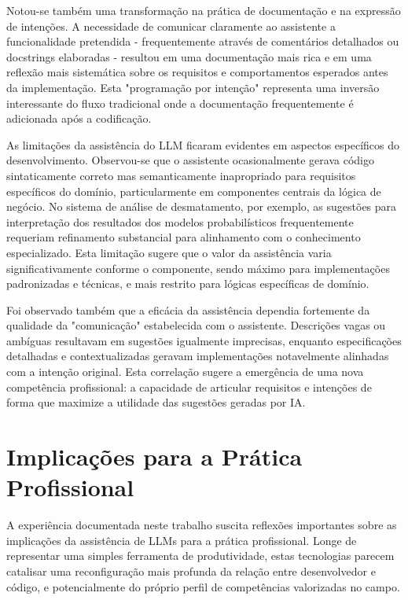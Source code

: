 \documentclass[12pt,a4paper]{article}
\begin{document}
Notou-se também uma transformação na prática de documentação e na expressão de intenções. A necessidade de comunicar claramente ao assistente a funcionalidade pretendida - frequentemente através de comentários detalhados ou docstrings elaboradas - resultou em uma documentação mais rica e em uma reflexão mais sistemática sobre os requisitos e comportamentos esperados antes da implementação. Esta "programação por intenção" representa uma inversão interessante do fluxo tradicional onde a documentação frequentemente é adicionada após a codificação.

As limitações da assistência do LLM ficaram evidentes em aspectos específicos do desenvolvimento. Observou-se que o assistente ocasionalmente gerava código sintaticamente correto mas semanticamente inapropriado para requisitos específicos do domínio, particularmente em componentes centrais da lógica de negócio. No sistema de análise de desmatamento, por exemplo, as sugestões para interpretação dos resultados dos modelos probabilísticos frequentemente requeriam refinamento substancial para alinhamento com o conhecimento especializado. Esta limitação sugere que o valor da assistência varia significativamente conforme o componente, sendo máximo para implementações padronizadas e técnicas, e mais restrito para lógicas específicas de domínio.

Foi observado também que a eficácia da assistência dependia fortemente da qualidade da "comunicação" estabelecida com o assistente. Descrições vagas ou ambíguas resultavam em sugestões igualmente imprecisas, enquanto especificações detalhadas e contextualizadas geravam implementações notavelmente alinhadas com a intenção original. Esta correlação sugere a emergência de uma nova competência profissional: a capacidade de articular requisitos e intenções de forma que maximize a utilidade das sugestões geradas por IA.

\section{Implicações para a Prática Profissional}

A experiência documentada neste trabalho suscita reflexões importantes sobre as implicações da assistência de LLMs para a prática profissional. Longe de representar uma simples ferramenta de produtividade, estas tecnologias parecem catalisar uma reconfiguração mais profunda da relação entre desenvolvedor e código, e potencialmente do próprio perfil de competências valorizadas no campo.
\end{document}
